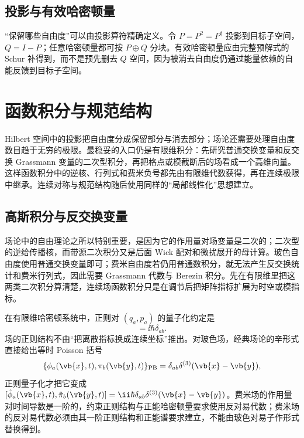 

\subsection{投影与有效哈密顿量}
“保留哪些自由度”可以由投影算符精确定义。令 $P=P^2=P^\dagger$ 投影到目标子空间，$Q=I-P$；任意哈密顿量都可按 $P\oplus Q$ 分块。有效哈密顿量应由完整预解式的 Schur 补得到，而不是预先删去 $Q$ 空间，因为被消去自由度仍通过能量依赖的自能反馈到目标子空间。





\section{函数积分与规范结构}

Hilbert 空间中的投影把自由度分成保留部分与消去部分；场论还需要处理自由度数目趋于无穷的极限。最稳妥的入口仍是有限维积分：先研究普通交换变量和反交换 Grassmann 变量的二次型积分，再把格点或模截断后的场看成一个高维向量。这样函数积分中的逆核、行列式和费米负号都先由有限维代数获得，再在连续极限中继承。连续对称与规范结构随后使用同样的“局部线性化”思想建立。

\subsection{高斯积分与反交换变量}
场论中的自由理论之所以特别重要，是因为它的作用量对场变量是二次的；二次型的逆给传播核，而带源二次积分又是后面 Wick 配对和微扰展开的母计算。玻色自由度使用普通交换变量即可；费米自由度若仍用普通数积分，就无法产生反交换统计和费米行列式，因此需要 Grassmann 代数与 Berezin 积分。先在有限维里把这两类二次积分算清楚，连续场函数积分只是在调节后把矩阵指标扩展为时空或模指标。

在有限维哈密顿系统中，正则对 $(q_a,p_a)$ 的量子化约定是
\begin{equation}
[\hat q_a,\hat p_b]=\ii\hbar\delta_{ab}.
\label{eq:global-canonical-quantization}
\end{equation}
场的正则结构不由“把离散指标换成连续坐标”推出。对玻色场，经典场论的辛形式直接给出等时 Poisson 括号
\[
 \{\phi_a(\vb{x},t),\pi_b(\vb{y},t)\}_{\rm PB}
 =\delta_{ab}\delta^{(3)}(\vb{x}-\vb{y}),
\]
正则量子化才把它变成 $[\hat\phi_a(\vb{x},t),\hat\pi_b(\vb{y},t)]=\ii\hbar\delta_{ab}\delta^{(3)}(\vb{x}-\vb{y})$。费米场的作用量对时间导数是一阶的，约束正则结构与正能哈密顿量要求使用反对易代数；费米场的反对易代数必须由其一阶正则结构和正能谱要求建立，不能由玻色对易子作形式替换得到。

